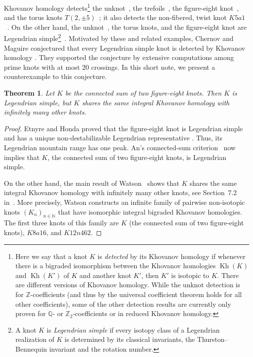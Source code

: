\documentclass{amsart} %
\newcommand{\Z}{\mathbb{Z}}
\newcommand{\Q}{\mathbb{Q}}
\newcommand{\N}{\mathbb{N}}
\newcommand{\Kh}{\operatorname{Kh}}
\theoremstyle{thm}
\newtheorem{theorem}[Theorem]{Theorem}
\theoremstyle{definition}
\numberwithin{equation}{section}
\begin{document}
Khovanov homology detects\footnote{Here we say that a knot $K$ is \textit{detected} by its Khovanov homology if whenever there is a bigraded isomorphism between the Khovanov homologies $\Kh(K)$ and $\Kh(K')$ of $K$ and another knot $K'$, then $K'$ is isotopic to $K$. There are different versions of Khovanov homology. While the unknot detection is for $\Z$-coefficients (and thus by the universal coefficient theorem holds for all other coefficients), some of the other detection results are currently only proven for $\Q$- or $\Z_2$-coefficients or in reduced Khovanov homology.} the unknot~\cite{KM11}, the trefoils~\cite{BS22},
the figure-eight knot~\cite{BDLLS21}, and the torus knots
$T(2,\pm5)$~\cite{BHS25}; it also detects the non-fibered, twist knot
$K5a1$~\cite{BS25}. On the other hand, the unknot~\cite{EF}, the torus knots, and the figure-eight knot are Legendrian simple\footnote{A knot $K$ is \textit{Legendrian simple} if every isotopy class of a Legendrian realization of $K$ is determined by its classical invariants, the Thurston--Bennequin invariant and the rotation number.}~\cite{EH01}. 
Motivated by these and
related examples, Chernov and Maguire conjectured that every
Legendrian simple knot is detected by Khovanov homology
\cite[Conjecture~3]{CM26}. They supported the conjecture by extensive
computations among prime knots with at most $20$ crossings. In this short note, we present a counterexample to this conjecture.

\begin{theorem}\label{thm:counterexample}
Let $K$ be the connected sum of two figure-eight knots. Then $K$ is Legendrian simple, but $K$ shares the same integral Khovanov homology with infinitely many other knots.
\end{theorem}

\begin{proof}
Etnyre and Honda proved that the figure-eight knot is Legendrian simple and
has a unique non-destabilizable Legendrian representative
\cite[Lemma 5.2, Theorem 5.3, Proposition 5.9]{EH01}. Thus, its Legendrian mountain range has one peak. An's
connected-sum criterion~\cite[Theorem~1]{An16} now implies that $K$, 
the connected sum of two figure-eight knots, is Legendrian simple.

On the other hand, the main result of Watson~\cite{Wat07} shows that $K$ shares the same integral Khovanov homology with infinitely many other knots, see Section~7.2 in~\cite{Wat07}. More precisely, Watson constructs an infinite family of pairwise non-isotopic knots $(K_n)_{n\in\N}$ that have isomorphic integral bigraded Khovanov homologies. The first three knots of this family are $K$ (the connected sum of two figure-eight knots), $K8a16$, and $K12n462$.
\end{proof}
\end{document}
